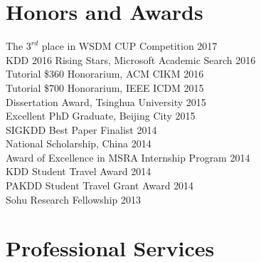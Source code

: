 \documentclass[margin, 9pt]{res}
\begin{document}
\begin{resume}

\section{Honors and Awards}

{The $3^{rd}$ place in WSDM CUP Competition} \hfill{2017} \\
{KDD 2016 Rising Stars, Microsoft Academic Search} \hfill{2016} \\
{Tutorial \$360 Honorarium, ACM CIKM} \hfill{2016} \\
{Tutorial \$700 Honorarium, IEEE ICDM} \hfill{2015} \\
{Dissertation Award, Tsinghua University} \hfill{2015} \\
{Excellent PhD Graduate, Beijing City} \hfill{2015} \\
{SIGKDD Best Paper Finalist} \hfill{2014} \\
{National Scholarship, China} \hfill{2014} \\
{Award of Excellence in MSRA Internship Program} \hfill{2014} \\
{KDD Student Travel Award} \hfill{2014} \\
{PAKDD Student Travel Grant Award} \hfill{2014} \\
{Sohu Research Fellowship} \hfill{2013}


\section{Professional Services}


\end{resume}
\end{document}
